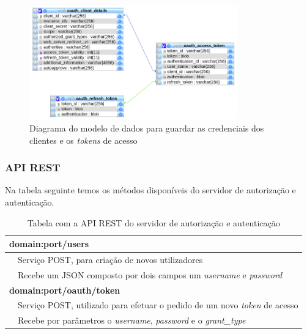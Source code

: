  \begin{figure}[H]
  \centering
  \includegraphics[width=0.8\textwidth]{imgs/auth-diagram.png}
  \caption[Diagrama do modelo de dados para guardar as credenciais dos clientes e os  \textit{tokens} de acesso]{Diagrama do modelo de dados para guardar as credenciais dos clientes e os  \textit{tokens} de acesso}
  
  \label{f:auth-diagram}
\end{figure}

\subsubsection{API REST}
\label{l:restapiAUTH}
Na tabela seguinte temos os métodos disponíveis do servidor de autorização e autenticação.
\begin{table}[H]
\label{t:apirest-auth}
\centering
\begin{tabularx}{1\textwidth}{|p{0.3cm} p{14.4cm}|}
\multicolumn{2}{l}{\textbf{domain:port/users}}  \\ \hline 
 & Serviço POST, para criação de novos utilizadores \\
 & Recebe um JSON composto por dois campos um  \textit{username} e  \textit{password} \\ \hline
\multicolumn{2}{l}{\textbf{domain:port/oauth/token}} \\ \hline
 & Serviço POST, utilizado para efetuar o pedido de um novo  \textit{token} de acesso \\
 & Recebe por parâmetros o  \textit{username},  \textit{password} e o  \textit{grant\_type} \\ \hline
\end{tabularx}
\caption{Tabela com a API REST do servidor de autorização e autenticação}
\end{table}


